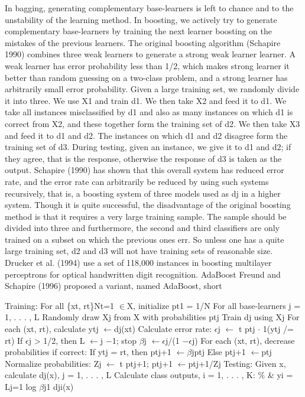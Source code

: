 In bagging, generating complementary base-learners is left to chance and to the unstability of the learning method. In boosting, we actively try to generate complementary base-learners by training the next learner boosting on the mistakes of the previous learners. The original boosting algorithm (Schapire 1990) combines three weak learners to generate a strong weak learner learner. A weak learner has error probability less than 1/2, which makes strong learner it better than random guessing on a two-class problem, and a strong learner has arbitrarily small error probability. Given a large training set, we randomly divide it into three. We use X1 and train d1. We then take X2 and feed it to d1. We take all instances misclassified by d1 and also as many instances on which d1 is correct from X2, and these together form the training set of d2. We then take X3 and feed it to d1 and d2. The instances on which d1 and d2 disagree form the training set of d3. During testing, given an instance, we give it to d1 and d2; if they agree, that is the response, otherwise the response of d3 is taken as the output. Schapire (1990) has shown that this overall system has reduced error rate, and the error rate can arbitrarily be reduced by using such systems recursively, that is, a boosting system of three models used as dj in a higher system. Though it is quite successful, the disadvantage of the original boosting method is that it requires a very large training sample. The sample should be divided into three and furthermore, the second and third classifiers are only trained on a subset on which the previous ones err. So unless one has a quite large training set, d2 and d3 will not have training sets of reasonable size. Drucker et al. (1994) use a set of 118,000 instances in boosting multilayer perceptrons for optical handwritten digit recognition. AdaBoost Freund and Schapire (1996) proposed a variant, named AdaBoost, short

Training: For all \{xt, rt\}Nt=1 $\in$X, initialize pt1 = 1/N For all base-learners j = 1, . . . , L Randomly draw Xj from X with probabilities ptj Train dj using Xj For each (xt, rt), calculate ytj $\leftarrow$dj(xt) Calculate error rate: $\epsilon$j $\leftarrow$ t ptj $\cdot$ 1(ytj /= rt) If $\epsilon$j > 1/2, then L $\leftarrow$j $-$1; stop $\beta$j $\leftarrow$$\epsilon$j/(1 $-$$\epsilon$j) For each (xt, rt), decrease probabilities if correct: If ytj = rt, then ptj+1 $\leftarrow$$\beta$jptj Else ptj+1 $\leftarrow$ptj Normalize probabilities: Zj $\leftarrow$ t ptj+1; ptj+1 $\leftarrow$ptj+1/Zj Testing: Given x, calculate dj(x), j = 1, . . . , L Calculate class outputs, i = 1, . . . , K: \% \& yi = Lj=1 log $\beta$j1 dji(x)

